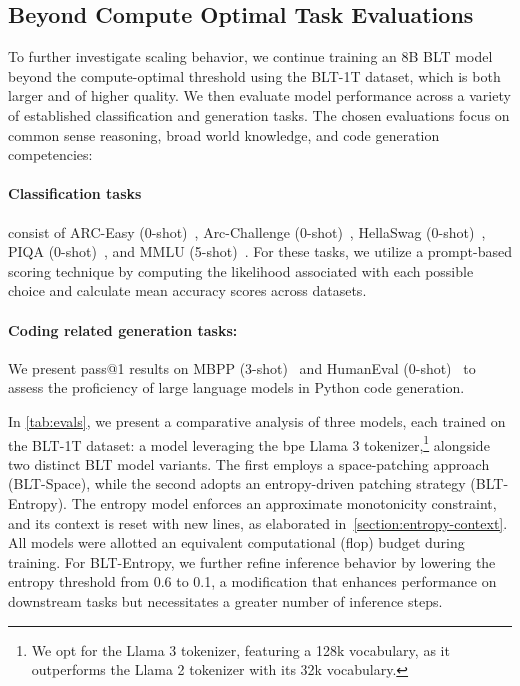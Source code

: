 \subsection{Beyond Compute Optimal Task Evaluations}
\label{section:evals}
To further investigate scaling behavior, we continue training an 8B {\textsc BLT} model beyond the compute-optimal threshold using the {\textsc BLT}-1T dataset, which is both larger and of higher quality. We then evaluate model performance across a variety of established classification and generation tasks. The chosen evaluations focus on common sense reasoning, broad world knowledge, and code generation competencies:
\paragraph{Classification tasks} consist of ARC-Easy (0-shot)~\citep{Eval_ARC}, Arc-Challenge (0-shot)~\citep{Eval_ARC}, HellaSwag (0-shot)~\citep{Eval_hellaswag}, PIQA (0-shot)~\citep{Eval_piqa}, and MMLU (5-shot)~\citep{hendrycks2020measuring}. For these tasks, we utilize a prompt-based scoring technique by computing the likelihood associated with each possible choice and calculate mean accuracy scores across datasets.
\paragraph{Coding related generation tasks:} We present pass@1 results on MBPP (3-shot)~\citep{Eval_MBPP} and HumanEval (0-shot)~\citep{Eval_HumanEval} to assess the proficiency of large language models in Python code generation.

In \autoref{tab:evals}, we present a comparative analysis of three models, each trained on the {\textsc BLT}-1T dataset: a model leveraging the bpe Llama 3 tokenizer,\footnote{We opt for the Llama 3 tokenizer, featuring a 128k vocabulary, as it outperforms the Llama 2 tokenizer with its 32k vocabulary.} alongside two distinct {\textsc BLT} model variants. The first employs a space-patching approach ({\textsc BLT}-Space), while the second adopts an entropy-driven patching strategy ({\textsc BLT}-Entropy). The entropy model enforces an approximate monotonicity constraint, and its context is reset with new lines, as elaborated in~\autoref{section:entropy-context}. All models were allotted an equivalent computational (flop) budget during training. For {\textsc BLT}-Entropy, we further refine inference behavior by lowering the entropy threshold from 0.6 to 0.1, a modification that enhances performance on downstream tasks but necessitates a greater number of inference steps.

